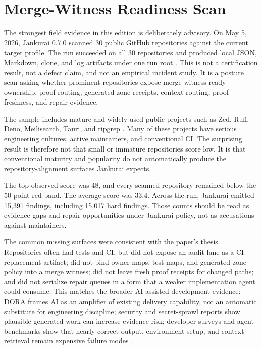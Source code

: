 

\section{Merge-Witness Readiness Scan}

The strongest field evidence in this edition is deliberately advisory. On May 5, 2026, Jankurai 0.7.0 scanned 30 public GitHub repositories against the current target profile. The run succeeded on all 30 repositories and produced local JSON, Markdown, clone, and log artifacts under one run root \cite{jankuraiPublicRepoRun2026}. This is not a certification result, not a defect claim, and not an empirical incident study. It is a posture scan asking whether prominent repositories expose merge-witness-ready ownership, proof routing, generated-zone receipts, context routing, proof freshness, and repair evidence.

The sample includes mature and widely used public projects such as Zed, Ruff, Deno, Meilisearch, Tauri, and ripgrep \cite{zedGithub2026,ruffGithub2026,denoGithub2026,meilisearchGithub2026,tauriGithub2026,ripgrepGithub2026}. Many of these projects have serious engineering cultures, active maintainers, and conventional CI. The surprising result is therefore not that small or immature repositories score low. It is that conventional maturity and popularity do not automatically produce the repository-alignment surfaces Jankurai expects.

The top observed score was 48, and every scanned repository remained below the 50-point red band. The average score was 33.4. Across the run, Jankurai emitted 15,391 findings, including 15,017 hard findings. Those counts should be read as evidence gaps and repair opportunities under Jankurai policy, not as accusations against maintainers.

\PublicRepoScoreAggregateTable

The common missing surfaces were consistent with the paper's thesis. Repositories often had tests and CI, but did not expose an audit lane as a CI replacement artifact; did not bind owner maps, test maps, and generated-zone policy into a merge witness; did not leave fresh proof receipts for changed paths; and did not serialize repair queues in a form that a weaker implementation agent could consume. This matches the broader AI-assisted development evidence: DORA frames AI as an amplifier of existing delivery capability, not an automatic substitute for engineering discipline; security and secret-sprawl reports show plausible generated work can increase evidence risk; developer surveys and agent benchmarks show that nearly-correct output, environment setup, and context retrieval remain expensive failure modes \cite{doraStateAIAssistedSoftwareDevelopment2025,veracodeGenaiCodeSecurity2025,gitguardianSecretsSprawl2026,gitguardianSecretsSprawl2026Blog,stackOverflowAISurvey2025,sweAgentAci2024,setupBench2025,contextBench2026}.

